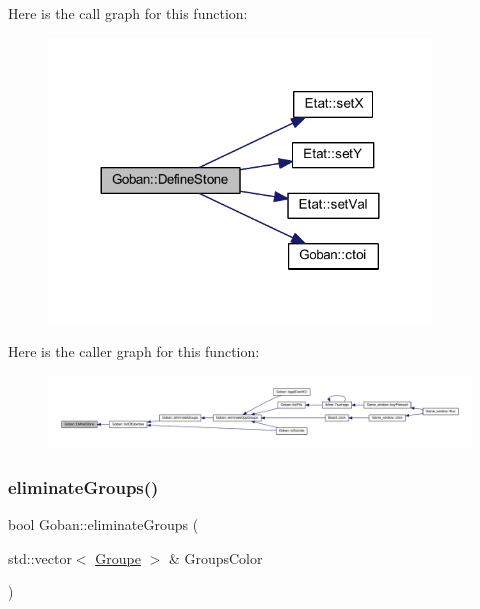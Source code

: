 Here is the call graph for this function\+:\nopagebreak
\begin{figure}[H]
\begin{center}
\leavevmode
\includegraphics[width=288pt]{class_goban_a0e2596110cdbb9b007b2b2fd8d5a9973_cgraph}
\end{center}
\end{figure}
Here is the caller graph for this function\+:\nopagebreak
\begin{figure}[H]
\begin{center}
\leavevmode
\includegraphics[width=350pt]{class_goban_a0e2596110cdbb9b007b2b2fd8d5a9973_icgraph}
\end{center}
\end{figure}
\mbox{\label{class_goban_a1ec70508987f66afff5f8df381731fac}} 
\subsubsection{\texorpdfstring{eliminate\+Groups()}{eliminateGroups()}}
{\footnotesize\ttfamily bool Goban\+::eliminate\+Groups (\begin{DoxyParamCaption}\item[{std\+::vector$<$ \hyperlink{class_groupe}{Groupe} $>$ \&}]{Groups\+Color }\end{DoxyParamCaption})}

